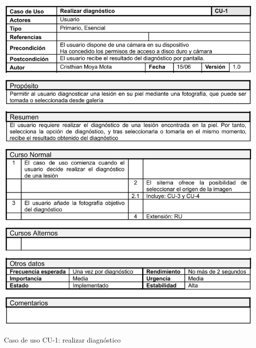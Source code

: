   \begin{table}[H]
	\centering
	\includegraphics[scale=0.81]{imagenes/cu-1.png}
	\caption{Caso de uso CU-1: realizar diagnóstico}
	\label{fig:cu1}
\end{table}



